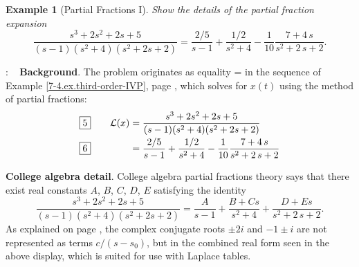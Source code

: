 \documentclass{article}
\def\df{\bfseries}
\def\dd{\displaystyle}
\def\Ll{{\cal L}}
\def\BF#1{{\df #1}}
\newtheorem{Example}{Example}[section]
\newenvironment{Solution}{\par\noindent{\sffamily\bfseries\upshape Solution}:\small\rm}{\par\medskip}
\begin{document}
\begin{Example}[Partial Fractions I]\label{7-4.ex.partial-fractions-I}
Show the details of the partial fraction expansion
$$\dd  \frac{s^3+2s^2+2s+5}
        {(s-1)(s^2+4)(s^2+2s+2)}
= \dd   \frac{2/5}{s-1}+\frac{1/2}{{s}^{2}+4}
  -\frac{1}{10}{\frac {7+4\,s}{{s}^{2}+2\,s+2}}.
$$
\end{Example}
\begin{Solution} ~\newline
\BF{Background}. The problem originates as equality
= in the sequence of Example
\ref{7-4.ex.third-order-IVP}, page
\pageref{7-4.ex.third-order-IVP}, which solves for $x(t)$ using
the method of partial fractions:
$$\begin{array}{ll}
\fbox{5}\quad& \dd  \Ll(x)= \frac{s^3+2s^2+2s+5}
        {(s-1)(s^2+4)(s^2+2s+2)}
        \\[2ex]
\fbox{6}\quad& \dd  \phantom{\Ll(x)}=
\frac{2/5}{s-1}+\frac{1/2}{{s}^{2}+4}
  -\frac{1}{10}{\frac {7+4\,s}{{s}^{2}+2\,s+2}}
\end{array}
$$

\BF{College algebra detail}. College algebra partial fractions
theory says that there exist real constants $A$, $B$, $C$, $D$,
$E$ satisfying the identity
$$\dd  \frac{s^3+2s^2+2s+5}
        {(s-1)(s^2+4)(s^2+2s+2)}
= \dd   \frac{A}{s-1}+\frac{B+Cs}{{s}^{2}+4}
  +{\frac {D+Es}{{s}^{2}+2\,s+2}}.
$$
As explained on page \pageref{7-4.eq.root-alpha-beta}, the complex
conjugate roots $\pm 2i$ and $-1\pm i$ are not represented as
terms $c/(s-s_0)$, but in the combined real form seen in the above
display, which is suited for use with Laplace tables.


\end{Solution}
\end{document}
